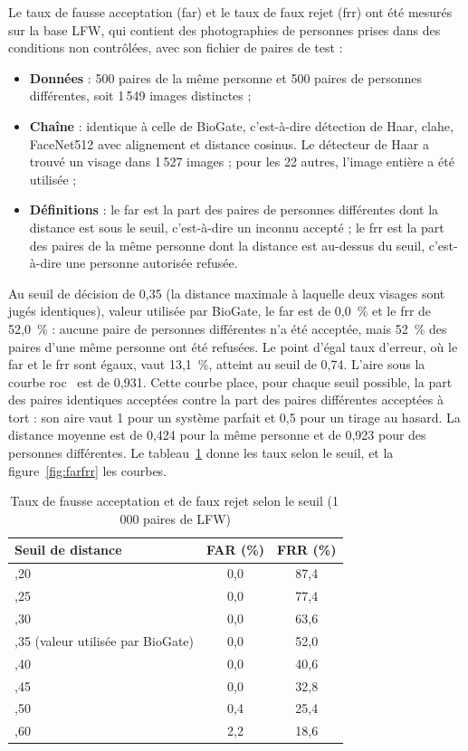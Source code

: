 \begin{maj}
Le taux de fausse acceptation (\gls{far}) et le taux de faux rejet (\gls{frr}) ont été mesurés sur la base LFW, qui contient des photographies de personnes prises dans des conditions non contrôlées, avec son fichier de paires de test :
\begin{itemize}
  \item \textbf{Données} : 500 paires de la même personne et 500 paires de personnes différentes, soit 1\,549 images distinctes ;
  \item \textbf{Chaîne} : identique à celle de BioGate, c'est-à-dire détection de Haar, \gls{clahe}, FaceNet512 avec alignement et distance cosinus. Le détecteur de Haar a trouvé un visage dans 1\,527 images ; pour les 22 autres, l'image entière a été utilisée ;
  \item \textbf{Définitions} : le \gls{far} est la part des paires de personnes différentes dont la distance est sous le seuil, c'est-à-dire un inconnu accepté ; le \gls{frr} est la part des paires de la même personne dont la distance est au-dessus du seuil, c'est-à-dire une personne autorisée refusée.
\end{itemize}

Au seuil de décision de 0,35 (la distance maximale à laquelle deux visages sont jugés identiques), valeur utilisée par BioGate, le \gls{far} est de 0,0~\% et le \gls{frr} de 52,0~\% : aucune paire de personnes différentes n'a été acceptée, mais 52~\% des paires d'une même personne ont été refusées. Le point d'égal taux d'erreur, où le \gls{far} et le \gls{frr} sont égaux, vaut 13,1~\%, atteint au seuil de 0,74. L'aire sous la courbe \gls{roc}~\cite{fawcett2006roc} est de 0,931. Cette courbe place, pour chaque seuil possible, la part des paires identiques acceptées contre la part des paires différentes acceptées à tort : son aire vaut 1 pour un système parfait et 0,5 pour un tirage au hasard. La distance moyenne est de 0,424 pour la même personne et de 0,923 pour des personnes différentes. Le tableau~\ref{tab:farfrr} donne les taux selon le seuil, et la figure~\ref{fig:farfrr} les courbes.
\end{maj}

\begin{table}[H]
\centering
\caption{Taux de fausse acceptation et de faux rejet selon le seuil (1\,000 paires de LFW)}\label{tab:farfrr}
\small
\begin{tabularx}{\textwidth}{@{}>{\raggedright\arraybackslash}Xcc@{}}
\toprule
\textbf{Seuil de distance} & \textbf{FAR (\%)} & \textbf{FRR (\%)} \\
\midrule
0,20 & 0,0 & 87,4 \\
0,25 & 0,0 & 77,4 \\
0,30 & 0,0 & 63,6 \\
0,35 (valeur utilisée par BioGate) & 0,0 & 52,0 \\
0,40 & 0,0 & 40,6 \\
0,45 & 0,0 & 32,8 \\
0,50 & 0,4 & 25,4 \\
0,60 & 2,2 & 18,6 \\
\bottomrule
\end{tabularx}
\end{table}

